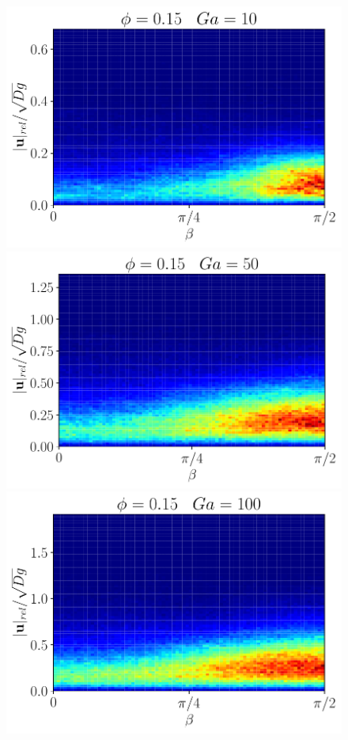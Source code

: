 \begin{figure}[h!]
    \includegraphics[scale = 0.9,height = \size]{image/N_10/beta/2DMAP_beta_v_rel_dmin_10_Bo1PHI0_15mu_r0_42Ga10.pdf}
    \includegraphics[scale = 0.9,height = \size]{image/N_10/beta/2DMAP_beta_v_rel_dmin_10_Bo1PHI0_15mu_r0_42Ga50.pdf}
    \includegraphics[scale = 0.9,height = \size]{image/N_10/beta/2DMAP_beta_v_rel_dmin_10_Bo1PHI0_15mu_r0_42Ga100.pdf}

\end{figure}
